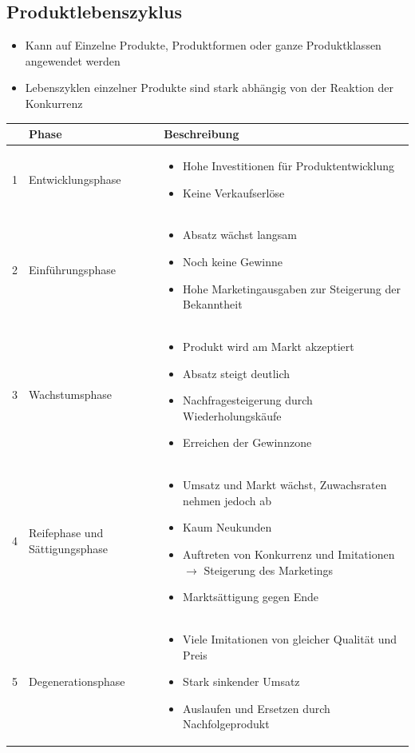 \documentclass[titlepage,parskip=half]{scrartcl}
\begin{document}
\subsection{Produktlebenszyklus}
\begin{itemize}
    \item Kann auf Einzelne Produkte, Produktformen oder ganze Produktklassen angewendet werden
    \item Lebenszyklen einzelner Produkte sind stark abhängig von der Reaktion der Konkurrenz
\end{itemize}


\begin{tabularx}{\textwidth}{|r|l|X|} \hline
    & Phase & Beschreibung \\ \hline
    1 & Entwicklungsphase & 
    \begin{itemize}[noitemsep]
        \item Hohe Investitionen für Produktentwicklung
        \item Keine Verkaufserlöse
    \end{itemize} \\ \hline
    2 & Einführungsphase & 
    \begin{itemize}[noitemsep]
        \item Absatz wächst langsam
        \item Noch keine Gewinne
        \item Hohe Marketingausgaben zur Steigerung der Bekanntheit
    \end{itemize} \\ \hline
    3 & Wachstumsphase & 
    \begin{itemize}[noitemsep]
        \item Produkt wird am Markt akzeptiert
        \item Absatz steigt deutlich
        \item Nachfragesteigerung durch Wiederholungskäufe
        \item Erreichen der Gewinnzone
    \end{itemize} \\ \hline
    4 & Reifephase und Sättigungsphase & 
    \begin{itemize}[noitemsep]
        \item Umsatz und Markt wächst, Zuwachsraten nehmen jedoch ab
        \item Kaum Neukunden
        \item Auftreten von Konkurrenz und Imitationen $\rightarrow$ Steigerung des Marketings
        \item Marktsättigung gegen Ende
    \end{itemize} \\ \hline
    5 & Degenerationsphase & 
    \begin{itemize}[noitemsep]
        \item Viele Imitationen von gleicher Qualität und Preis
        \item Stark sinkender Umsatz
        \item Auslaufen und Ersetzen durch Nachfolgeprodukt
    \end{itemize} \\ \hline
\end{tabularx}
\end{document}
